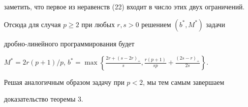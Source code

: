 \begin{pf}
заметить, что первое из неравенств (22) входит в число этих двух ограничений.





Отсюда для случая $p\ge 2$ при любых $r,s>0$ решением $(b^*,M^*)$ задачи


дробно-линейного программирования будет


$M^*=2r(p+1)/p$, $b^*= \max \left\{


\frac{2r+(s-2r)_+}{s}, \frac{r(p+1)}{sp} + \frac{(2s-r)_+}{2s} \right\}$.





Решая аналогичным образом задачу при $p<2$, мы тем самым завершаем


доказательство теоремы 3.


\end{pf}





